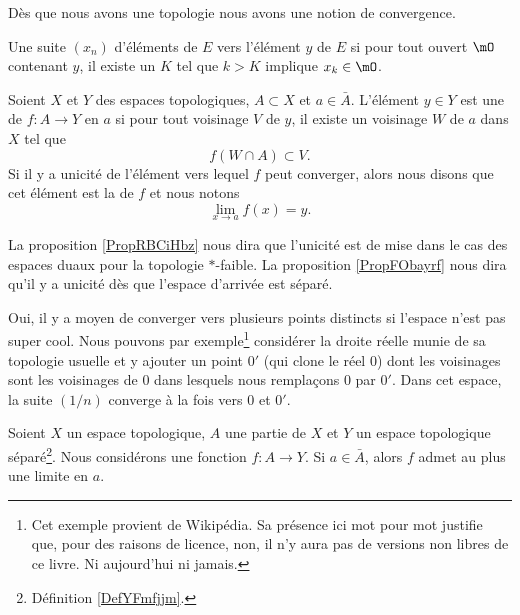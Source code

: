 Dès que nous avons une topologie nous avons une notion de convergence.
\begin{definition} \label{DefXSnbhZX}
    Une suite $(x_n)$ d'éléments de $E$  vers l'élément $y$ de $E$ si pour tout ouvert $\mO$ contenant $y$, il existe un $K$ tel que $k>K$ implique $x_k\in\mO$. 
\end{definition}

\begin{definition}\label{DefYNVoWBx}
    Soient \( X\) et \( Y\) des espaces topologiques, \( A\subset X\) et \( a\in\bar A\). L'élément \( y\in Y\) est une  de \( f\colon A\to Y\) en \( a\) si pour tout voisinage \( V\) de \( y\), il existe un voisinage \( W\) de \( a\) dans \( X\) tel que 
    \begin{equation}
        f(W\cap A)\subset V.
    \end{equation}
    Si il y a unicité de l'élément vers lequel \( f\) peut converger, alors nous disons que cet élément est la  de \( f\) et nous notons
    \begin{equation}
        \lim_{x\to a} f(x)=y.
    \end{equation}
\end{definition}
La proposition \ref{PropRBCiHbz} nous dira que l'unicité est de mise dans le cas des espaces duaux pour la topologie \( *\)-faible. La proposition \ref{PropFObayrf} nous dira qu'il y a unicité dès que l'espace d'arrivée est séparé.

\begin{example}
    Oui, il y a moyen de converger vers plusieurs points distincts si l'espace n'est pas super cool. Nous pouvons par exemple\footnote{Cet exemple provient de Wikipédia\cite{EJVQuas}. Sa présence ici mot pour mot justifie que, pour des raisons de licence, non, il n'y aura pas de versions non libres de ce livre. Ni aujourd'hui ni jamais.} considérer la droite réelle munie de sa topologie usuelle et y ajouter un point $0'$ (qui clone le réel $0$) dont les voisinages sont les voisinages de $0$ dans lesquels nous remplaçons $0$ par $0'$. Dans cet espace, la suite $(1/n)$ converge à la fois vers $0$ et $0'$.
\end{example}

\begin{proposition}\label{PropFObayrf}
    Soient \( X\) un espace topologique, \( A\) une partie de \( X\) et \( Y\) un espace topologique séparé\footnote{Définition \ref{DefYFmfjjm}.}. Nous considérons une fonction \( f\colon A\to Y\). Si \( a\in\bar A\), alors \( f\) admet au plus une limite en \( a\).
\end{proposition}

